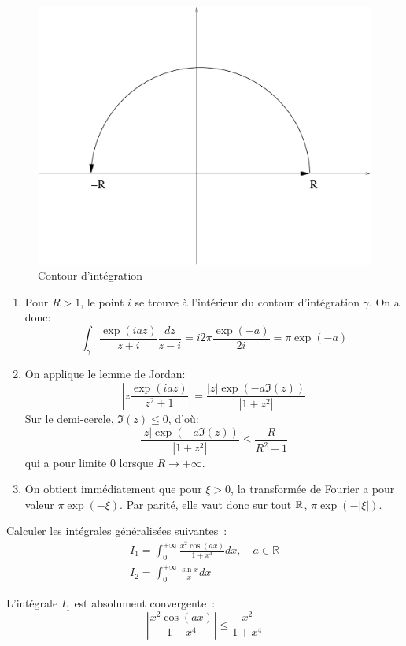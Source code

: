 \documentclass[a4paper, 12pt]{amsart}
\begin{document}
\begin{figure}[ht]
\includegraphics[scale=0.3]{contour_ex1.pdf}
\caption{Contour d'intégration}\label{fig:contour_ex1}
\end{figure}
\begin{enumerate}
 \item Pour $R > 1$, le point $i$ se trouve à l'intérieur du contour
d'intégration $\gamma$. On a donc:
\[
 \int_\gamma \frac{\exp(iaz)}{z+i} \frac{dz}{z-i} = i 2 \pi \frac{\exp(-a)}{2i}
= \pi \exp(-a)
\]
\item On applique le lemme de Jordan:
\[
\left|z\frac{\exp(iaz)}{z^2+1}\right| = \frac{|z|\exp(-a\Im(z))}{|1+z^2|}
\]
Sur le demi-cercle, $\Im(z) \leq 0$, d'où:
\[
\frac{|z|\exp(-a\Im(z))}{|1+z^2|} \leq \frac{R}{R^2-1}
\]
qui a pour limite 0 lorsque $R \to +\infty$.
\item On obtient immédiatement que pour $\xi > 0$, la transformée de Fourier a
pour valeur $\pi \exp(-\xi)$. Par parité, elle vaut donc sur tout $\mathbb{R}$,
$\pi \exp(-|\xi|)$.

\end{enumerate}
\begin{fex}
 Calculer les intégrales généralisées suivantes~:
\[
\begin{array}{l}
I_1 = \int_0^{+\infty} \frac{x^2 \cos(ax)}{1+x^4} dx , \quad a \in
\mathbb{R}\\
I_2 = \int_0^{+\infty} \frac{ \sin x}{x}dx
\end{array}
\]
\end{fex}
L'intégrale $I_1$ est absolument convergente~:
\[
\left |  \frac{x^2 \cos(ax)}{1+x^4} \right | \leq \frac{x^2}{1+x^4}
\]
\end{document}
